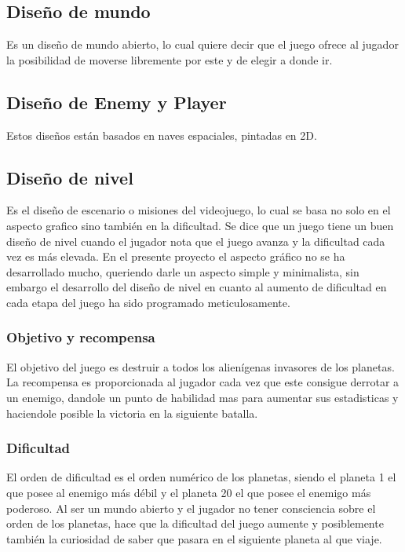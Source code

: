 \documentclass[a4paper,10pt]{article}
\begin{document}
\subsection{Diseño de mundo}
Es un diseño de mundo abierto, lo cual quiere decir que el 
juego ofrece al jugador la posibilidad de moverse libremente por 
este y de elegir a donde ir.

\subsection{Diseño de Enemy y Player}
Estos diseños están basados en naves espaciales, pintadas en 2D.

\subsection{Diseño de nivel}
Es el diseño de escenario o misiones del videojuego, 
lo cual se basa no solo en el aspecto grafico sino también 
en la dificultad. Se dice que un juego tiene un buen diseño de nivel 
cuando el jugador nota que el juego avanza y la dificultad cada vez es 
más elevada.
En el presente proyecto el aspecto gráfico no se ha desarrollado mucho, 
queriendo darle un aspecto simple y minimalista, sin embargo el desarrollo 
del diseño de nivel en cuanto al aumento de dificultad en cada etapa 
del juego ha sido programado meticulosamente.

\subsubsection{Objetivo y recompensa}
El objetivo del juego es destruir a todos los alienígenas invasores 
de los planetas.
La recompensa es proporcionada al jugador cada vez que este
consigue derrotar a un enemigo, dandole un punto de habilidad 
mas para aumentar sus estadisticas y haciendole posible la victoria 
en la siguiente batalla.

\subsubsection{Dificultad}
El orden de dificultad es el orden numérico de los planetas, 
siendo el planeta 1 el que posee al enemigo más débil y 
el planeta 20 el que posee el enemigo más poderoso.
Al ser un mundo abierto y el jugador no tener consciencia 
sobre el orden de los planetas, hace que la dificultad del 
juego aumente y posiblemente también la curiosidad de saber que 
pasara en el siguiente planeta al que viaje.
\cleardoublepage
\end{document}
